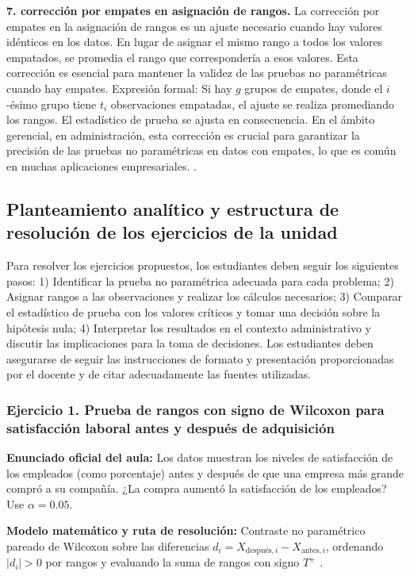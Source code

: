 {\textbf{7. corrección por empates en asignación de rangos.} La corrección por empates en la asignación de rangos es un ajuste necesario cuando hay valores idénticos en los datos. En lugar de asignar el mismo rango a todos los valores empatados, se promedia el rango que correspondería a esos valores. Esta corrección es esencial para mantener la validez de las pruebas no paramétricas cuando hay empates. Expresión formal: Si hay $g$ grupos de empates, donde el $i$-ésimo grupo tiene $t_i$ observaciones empatadas, el ajuste se realiza promediando los rangos. El estadístico de prueba se ajusta en consecuencia. En el ámbito gerencial, en administración, esta corrección es crucial para garantizar la precisión de las pruebas no paramétricas en datos con empates, lo que es común en muchas aplicaciones empresariales. \citep{anderson2012,lind2012,wackerly2010}.


\subsection{Planteamiento analítico y estructura de resolución de los ejercicios de la unidad}
Para resolver los ejercicios propuestos, los estudiantes deben seguir los siguientes pasos: 1) Identificar la prueba no paramétrica adecuada para cada problema; 2) Asignar rangos a las observaciones y realizar los cálculos necesarios; 3) Comparar el estadístico de prueba con los valores críticos y tomar una decisión sobre la hipótesis nula; 4) Interpretar los resultados en el contexto administrativo y discutir las implicaciones para la toma de decisiones. Los estudiantes deben asegurarse de seguir las instrucciones de formato y presentación proporcionadas por el docente y de citar adecuadamente las fuentes utilizadas.

\subsubsection*{Ejercicio 1. Prueba de rangos con signo de Wilcoxon para satisfacción laboral antes y después de adquisición}
\textbf{Enunciado oficial del aula:} Los datos muestran los niveles de satisfacción de los empleados (como porcentaje) antes y después de que una empresa más grande compró a su compañía. ¿La compra aumentó la satisfacción de los empleados? Use $\alpha = 0.05$.

\textbf{Modelo matemático y ruta de resolución:} Contraste no paramétrico pareado de Wilcoxon sobre las diferencias $d_i = X_{\text{después},i} - X_{\text{antes},i}$, ordenando $|d_i| > 0$ por rangos y evaluando la suma de rangos con signo $T^+$ \citep{levin2004,lind2012}.

}
